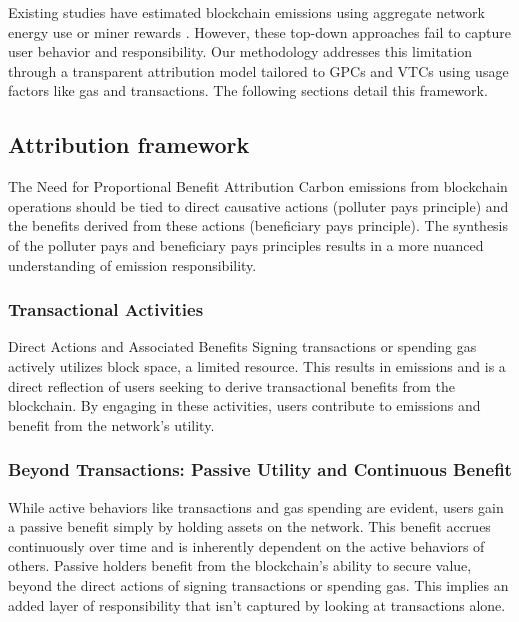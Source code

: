 \documentclass[11pt]{report}
\begin{document}
Existing studies have estimated blockchain emissions using aggregate network energy use or miner rewards \cite{devriesCryptocurrenciesRoadSustainability2022,devriesRevisitingBitcoinCarbon2022,neumuellerCambridgeBitcoinElectricity2021,mcdonaldEthereumEmissionsBottomup2022}. However, these top-down approaches fail to capture user behavior and responsibility. Our methodology addresses this limitation through a transparent attribution model tailored to GPCs and VTCs using usage factors like gas and transactions. The following sections detail this framework.

\subsection{Attribution framework}
The Need for Proportional Benefit Attribution
Carbon emissions from blockchain operations should be tied to direct causative actions (polluter pays principle) and the benefits derived from these actions (beneficiary pays principle). The synthesis of the polluter pays and beneficiary pays principles results in a more nuanced understanding of emission responsibility.

\subsubsection*{Transactional Activities}

Direct Actions and Associated Benefits
Signing transactions or spending gas actively utilizes block space, a limited resource. This results in emissions and is a direct reflection of users seeking to derive transactional benefits from the blockchain. By engaging in these activities, users contribute to emissions and benefit from the network's utility.

\subsubsection*{Beyond Transactions: Passive Utility and Continuous Benefit}
While active behaviors like transactions and gas spending are evident, users gain a passive benefit simply by holding assets on the network. This benefit accrues continuously over time and is inherently dependent on the active behaviors of others. Passive holders benefit from the blockchain's ability to secure value, beyond the direct actions of signing transactions or spending gas. This implies an added layer of responsibility that isn't captured by looking at transactions alone.
\end{document}

